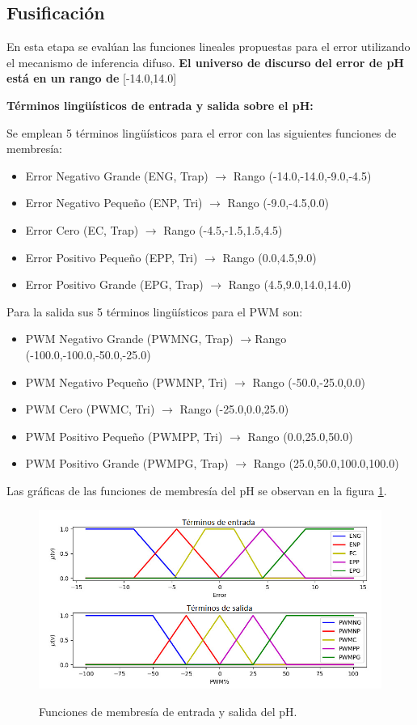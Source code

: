 \subsection{Fusificación} En esta etapa se evalúan las funciones lineales propuestas para el error utilizando el mecanismo de inferencia difuso.
\newpage
\textbf{El universo de discurso del error de pH está en un rango de} [-14.0,14.0]

\textbf{Términos lingüísticos de entrada y salida sobre el pH:}

Se emplean 5 términos lingüísticos para el error con las siguientes funciones de membresía:
\begin{itemize}
 \item Error Negativo Grande (ENG, Trap) $\longrightarrow$ Rango (-14.0,-14.0,-9.0,-4.5)
 \item Error Negativo Pequeño (ENP, Tri) $\longrightarrow$ Rango (-9.0,-4.5,0.0)
 \item Error Cero (EC, Trap) $\longrightarrow$ Rango (-4.5,-1.5,1.5,4.5)
 \item Error Positivo Pequeño (EPP, Tri) $\longrightarrow$ Rango (0.0,4.5,9.0)  
 \item Error Positivo Grande (EPG, Trap) $\longrightarrow$ Rango (4.5,9.0,14.0,14.0)
 \end{itemize}

Para la salida sus 5 términos lingüísticos para el PWM son:
\begin{itemize}
 \item PWM Negativo Grande (PWMNG, Trap) $\longrightarrow$Rango (-100.0,-100.0,-50.0,-25.0)
 \item PWM Negativo Pequeño (PWMNP, Tri) $\longrightarrow$ Rango (-50.0,-25.0,0.0)
 \item PWM Cero (PWMC, Tri) $\longrightarrow$ Rango (-25.0,0.0,25.0)
 \item PWM Positivo Pequeño (PWMPP, Tri) $\longrightarrow$ Rango (0.0,25.0,50.0) 
 \item PWM Positivo Grande (PWMPG, Trap) $\longrightarrow$ Rango (25.0,50.0,100.0,100.0)
\end{itemize}

Las gráficas de las funciones de membresía del pH se observan en la figura \ref{ph1}.

\begin{figure}[H]
\centering
         \includegraphics[scale=0.75]{imgs/FuncionPH_Esp.png} \\
    \caption{Funciones de membresía de entrada y salida del pH.}\label{ph1}
\end{figure}

